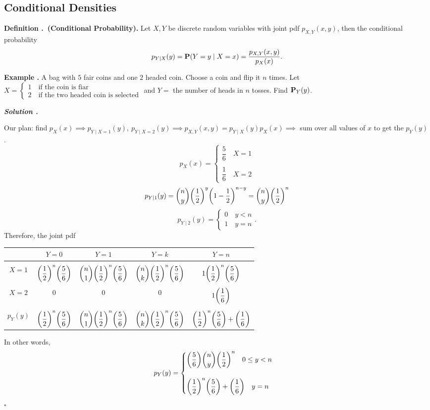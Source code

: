 \documentclass[12pt, a4paper]{article}
\newcounter{index}[subsection]
\newenvironment*{df}[1]{\par\noindent\textbf{Definition \thesubsection.\stepcounter{index}\theindex\ (#1).}}{\par}
\newenvironment*{eg}{\begin{framed}\par\noindent\textbf{Example \thesubsection.\stepcounter{index}\theindex}}{\par\end{framed}}
\newcounter{nprf}[subsection]
\newenvironment*{sol}{\par\indent\textbf{\textit{Solution \stepcounter{nprf}\thenprf.}}\par}{\hfill{$\square$}\par}
\def\dsst{\displaystyle}
\def\P{\vb{P}}
\begin{document}
\subsection{Conditional Densities}
\begin{df}{Conditional Probability}
	Let $X,Y$ be discrete random variables with joint pdf $p_{X,Y}(x,y)$, then the conditional probability \[p_{Y\mid X}(y)=\P(Y=y\mid X=x)=\dfrac{p_{X,Y}(x,y)}{p_X(x)}.\]	
\end{df}
\begin{eg}
	A bag with $5$ fair coins and one $2$ headed coin. Choose a coin and flip it $n$ times. Let $X=\begin{cases}1\quad\text{if the coin is fiar}\\2\quad\text{if the two headed coin is selected}\end{cases}$	and $Y=$ the number of heads in $n$ tosses. Find $\P_Y(y)$.
	\begin{sol}
		Our plan: find $p_X(x)\implies p_{Y\mid X=1}(y),\ p_{Y\mid X=2}(y)\implies p_{X,Y}(x,y)=p_{Y\mid X}(y)p_X(x)\implies$ sum over all values of $x$ to get the $p_Y(y)$. \[p_X(x)=\begin{cases}\dfrac{5}{6}\quad X=1\\\\\dfrac{1}{6}\quad X=2\end{cases}\]\[p_{Y\mid1}(y)=\binom{n}{y}\qty(\dfrac{1}{2})^y\qty(1-\dfrac{1}{2})^{n-y}=\binom{n}{y}\qty(\dfrac{1}{2})^n\]\[p_{Y\mid2}(y)=\begin{cases}0\quad y<n\\1\quad y=n\end{cases}.\] Therefore, the joint pdf 
		\begin{center}\begin{tabular}{c|c|c|c|c}
			&$Y=0$&$Y=1$&$Y=k$&$Y=n$\\\hline
			&&&\\
			$X=1$&$\qty(\dfrac{1}{2})^{n}\qty(\dfrac{5}{6})$&$\dsst\binom{n}{1}\qty(\dfrac{1}{2})^n\qty(\dfrac{5}{6})$&$\dsst\binom{n}{k}\qty(\frac{1}{2})^n\qty(\frac{5}{6})$&$1\dsst\qty(\frac{1}{2})^n\qty(\frac{5}{6})$\\
			&&&\\
			$X=2$&$0$&$0$&$0$&$1\dsst\qty(\frac{1}{6})$\\
			&&&\\
			$p_Y(y)$&$\qty(\dfrac{1}{2})^{n}\qty(\dfrac{5}{6})$&$\dsst\binom{n}{1}\qty(\dfrac{1}{2})^n\qty(\dfrac{5}{6})$&$\dsst\binom{n}{k}\qty(\frac{1}{2})^n\qty(\frac{5}{6})$&$\dsst\qty(\frac{1}{2})^n\qty(\frac{5}{6})+\qty(\frac{1}{6})$
		\end{tabular}\end{center}
		In other words, \[p_Y(y)=\begin{cases}\dsst\qty(\dfrac{5}{6})\binom{n}{y}\qty(\dfrac{1}{2})^n\quad 0\leq y<n\\\\\qty(\dfrac{1}{2})^n\qty(\dfrac{5}{6})+\qty(\dfrac{1}{6})\quad y=n\end{cases}\]
	\end{sol}
\end{eg}
\end{document}

